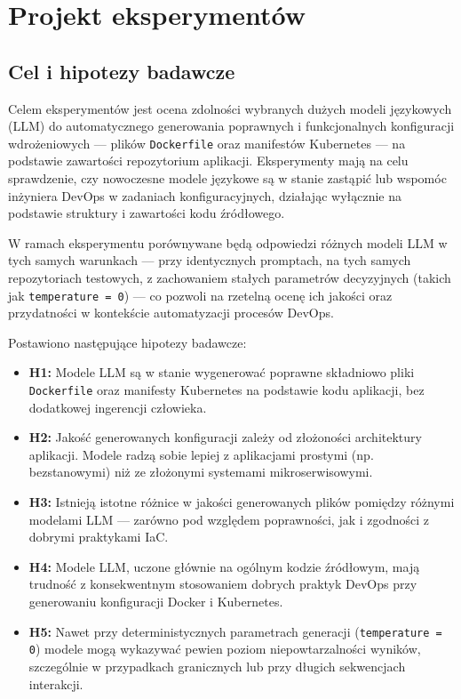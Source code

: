 \clearpage %
\section{Projekt eksperymentów}

\subsection{Cel i hipotezy badawcze}

Celem eksperymentów jest ocena zdolności wybranych dużych modeli językowych (LLM) do automatycznego generowania poprawnych i funkcjonalnych konfiguracji wdrożeniowych — plików \texttt{Dockerfile} oraz manifestów Kubernetes — na podstawie zawartości repozytorium aplikacji. Eksperymenty mają na celu sprawdzenie, czy nowoczesne modele językowe są w stanie zastąpić lub wspomóc inżyniera DevOps w zadaniach konfiguracyjnych, działając wyłącznie na podstawie struktury i zawartości kodu źródłowego.

W ramach eksperymentu porównywane będą odpowiedzi różnych modeli LLM w tych samych warunkach — przy identycznych promptach, na tych samych repozytoriach testowych, z zachowaniem stałych parametrów decyzyjnych (takich jak \texttt{temperature = 0}) — co pozwoli na rzetelną ocenę ich jakości oraz przydatności w kontekście automatyzacji procesów DevOps.

\bigskip

\noindent Postawiono następujące hipotezy badawcze:

\begin{itemize}
    \item \textbf{H1:} Modele LLM są w stanie wygenerować poprawne składniowo pliki \texttt{Dockerfile} oraz manifesty Kubernetes na podstawie kodu aplikacji, bez dodatkowej ingerencji człowieka.
    
    \item \textbf{H2:} Jakość generowanych konfiguracji zależy od złożoności architektury aplikacji. Modele radzą sobie lepiej z aplikacjami prostymi (np. bezstanowymi) niż ze złożonymi systemami mikroserwisowymi.
    
    \item \textbf{H3:} Istnieją istotne różnice w jakości generowanych plików pomiędzy różnymi modelami LLM — zarówno pod względem poprawności, jak i zgodności z dobrymi praktykami IaC.
    
    \item \textbf{H4:} Modele LLM, uczone głównie na ogólnym kodzie źródłowym, mają trudność z konsekwentnym stosowaniem dobrych praktyk DevOps przy generowaniu konfiguracji Docker i Kubernetes.
    
    \item \textbf{H5:} Nawet przy deterministycznych parametrach generacji (\texttt{temperature = 0}) modele mogą wykazywać pewien poziom niepowtarzalności wyników, szczególnie w przypadkach granicznych lub przy długich sekwencjach interakcji.
\end{itemize}

